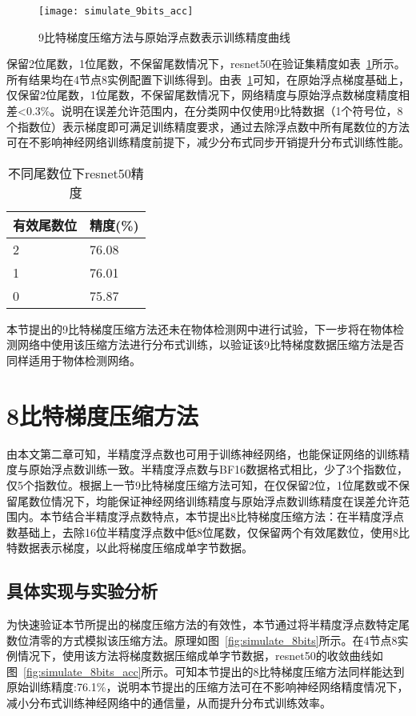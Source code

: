 \begin{figure}[htp]
\centering
\texttt{[image: simulate\_9bits\_acc]}
\caption{9比特梯度压缩方法与原始浮点数表示训练精度曲线}
\label{fig:simulate_9bits_acc}
\end{figure}

保留2位尾数，1位尾数，不保留尾数情况下，resnet50在验证集精度如表~\ref{tab:simulate_11_10_9bits_acc}所示。所有结果均在4节点8实例配置下训练得到。由表~\ref{tab:simulate_11_10_9bits_acc}可知，在原始浮点梯度基础上，仅保留2位尾数，1位尾数，不保留尾数情况下，网络精度与原始浮点数梯度精度相差<0.3\%。说明在误差允许范围内，在分类网中仅使用9比特数据（1个符号位，8个指数位）表示梯度即可满足训练精度要求，通过去除浮点数中所有尾数位的方法可在不影响神经网络训练精度前提下，减少分布式同步开销提升分布式训练性能。

\begin{table}[htb]
\centering
\noindent\begin{minipage}{0.45\textwidth}
\centering
\caption{不同尾数位下resnet50精度}
\label{tab:simulate_11_10_9bits_acc}
\begin{tabular}{p{2cm}p{2cm}}
\toprule[1.5pt]
有效尾数位 & 精度(\%) \\\midrule[1pt]
2 & 76.08 \\
1 & 76.01 \\
0 & 75.87 \\
\midrule[1pt]
\end{tabular}
\end{minipage}
\end{table}
本节提出的9比特梯度压缩方法还未在物体检测网中进行试验，下一步将在物体检测网络中使用该压缩方法进行分布式训练，以验证该9比特梯度数据压缩方法是否同样适用于物体检测网络。

\section{8比特梯度压缩方法}
由本文第二章可知，半精度浮点数也可用于训练神经网络，也能保证网络的训练精度与原始浮点数训练一致。半精度浮点数与BF16数据格式相比，少了3个指数位，仅5个指数位。根据上一节9比特梯度压缩方法可知，在仅保留2位，1位尾数或不保留尾数位情况下，均能保证神经网络训练精度与原始浮点数训练精度在误差允许范围内。本节结合半精度浮点数特点，本节提出8比特梯度压缩方法：在半精度浮点数基础上，去除16位半精度浮点数中低8位尾数，仅保留两个有效尾数位，使用8比特数据表示梯度，以此将梯度压缩成单字节数据。
\subsection{具体实现与实验分析}
为快速验证本节所提出的梯度压缩方法的有效性，本节通过将半精度浮点数特定尾数位清零的方式模拟该压缩方法。原理如图~\ref{fig:simulate_8bits}所示。在4节点8实例情况下，使用该方法将梯度数据压缩成单字节数据，resnet50的收敛曲线如图~\ref{fig:simulate_8bits_acc}所示。可知本节提出的8比特梯度压缩方法同样能达到原始训练精度:76.1\%，说明本节提出的压缩方法可在不影响神经网络精度情况下，减小分布式训练神经网络中的通信量，从而提升分布式训练效率。

